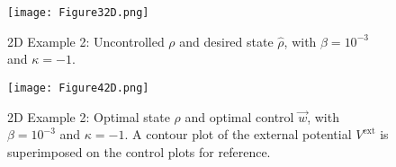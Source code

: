 
\begin{figure}[h]
	\texttt{[image: Figure32D.png]}
	\caption{2D Example 2: Uncontrolled $\rho$ and desired state $\widehat \rho$,  with $\beta = 10^{-3}$ and $\kappa = -1$. }
	\label{rhoHat2dEx4}
\end{figure}
\begin{figure}[h]
	\texttt{[image: Figure42D.png]}
	\caption{2D Example 2: Optimal state $\rho$ and optimal control $\vec{w}$, with $\beta = 10^{-3}$ and $\kappa = -1$. A contour plot of the external potential $V^{\text{ext}}$ is superimposed on the control plots for reference.} 
	\label{rhoOpt2dEx4}
\end{figure}







